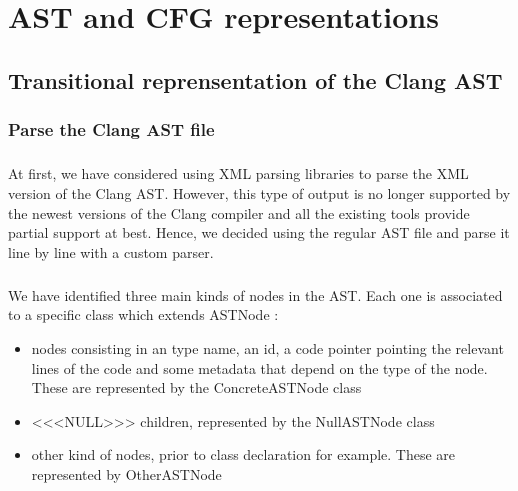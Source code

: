 \documentclass{report}
\begin{document}
\chapter{AST and CFG representations}

\paragraph{}
\hspace{4mm}\textnormal{}

\section{Transitional reprensentation of the Clang AST}

\subsection{Parse the Clang AST file}

\paragraph{}
\hspace{4mm}\textnormal{At first, we have considered using XML parsing libraries to parse the XML version of the Clang AST. However, 
this type of output is no longer supported by the newest versions of the Clang compiler and all the existing tools
provide partial support at best. Hence, we decided using the regular AST file and parse it line by line 
with a custom parser.}

\paragraph{}
\hspace{4mm}\textnormal{We have identified three main kinds of nodes in the AST. Each one is associated to a specific class which extends ASTNode :}

\vspace{4mm}
\begin{itemize}
\item nodes consisting in an type name, an id, a code pointer pointing the relevant lines of the code and some
metadata that depend on the type of the node. These are represented by the ConcreteASTNode class\vspace{1mm}
\item <<<NULL>>> children, represented by the NullASTNode class\vspace{1mm}
\item other kind of nodes, prior to class declaration for example. These are represented by OtherASTNode\vspace{1mm}
\end{itemize}
\end{document}
